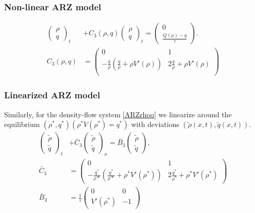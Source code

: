 \documentclass[a4paper, 10pt, conference]{ieeeconf}      %
\begin{document}
\subsubsection{Non-linear ARZ model}
\begin{subequations}
\begin{align}
\begin{pmatrix}
	\rho \\
	q
\end{pmatrix}_t 
&+
C_3\left(\rho, q\right)
\begin{pmatrix}
	\rho \\ 
	q
\end{pmatrix}_t
=
\begin{pmatrix}
	0 \\ 
	\frac{Q(\rho) - q}{\tau}
\end{pmatrix}. \label{ARZvq} \\
C_3 \left(\rho, q \right)
&= 
\begin{pmatrix}
	0 & 1 \\
	- \frac{q}{\rho} \left( \frac{q}{\rho} + \rho V'\left( \rho \right) \right) & 2 \frac{q}{\rho} + \rho V'\left( \rho \right) \\
\end{pmatrix}
\end{align}
\end{subequations}

\subsubsection{Linearized ARZ model}
Similarly, for the density-flow system \eqref{ARZrhoq} we linearize around the equilibrium $(\rho^*, q^*)(\rho^*V(\rho^*) = q^*)$ with deviations $(\tilde{\rho}(x,t), \tilde{q}(x,t))$.
{\footnotesize
\begin{align}
\begin{pmatrix}
	\tilde{\rho} \\
	\tilde{q}
\end{pmatrix}_t
&+ \bar{C}_3
\begin{pmatrix}
	\tilde{\rho} \\ 
	\tilde{q}
\end{pmatrix}_x 
= 
\bar{B}_3
\begin{pmatrix}
	\tilde{\rho} \\
	\tilde{q}
\end{pmatrix}, \\
\bar{C}_3 &=
\begin{pmatrix}
	0 & 1 \\
	-\frac{q^{*}}{\rho{*}} \left(
		\frac{q^{*}}{\rho{*}} + \rho^{*} V'\left( \rho^{*} \right) \right) & 2 \frac{q^{*}}{\rho^{*}} + \rho^{*} V'\left( \rho^{*} \right)
\end{pmatrix} \\
\bar{B}_3 &=
\frac{1}{\tau}
\begin{pmatrix}
	0 & 0 \\
	V'\left( \rho^{*} \right) & -1
\end{pmatrix}
\end{align}
}
\end{document}

